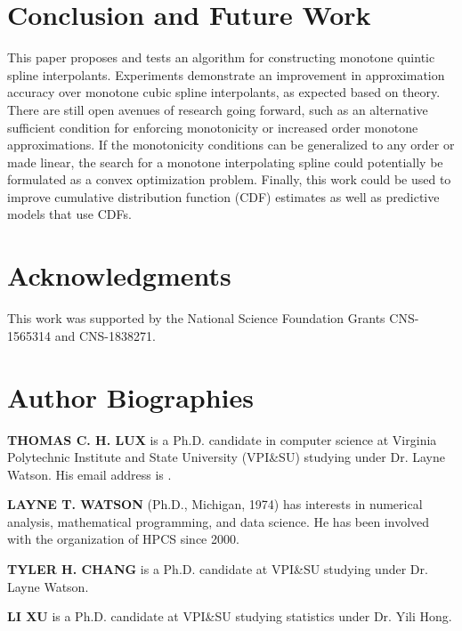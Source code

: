 \documentclass{scspaperproc}
\theoremstyle{scsthe}
\begin{document}
\section{Conclusion and Future Work}
\label{sec:conclusion}

This paper proposes and tests an algorithm for constructing monotone quintic spline interpolants. Experiments demonstrate an improvement in approximation accuracy over monotone cubic spline interpolants, as expected based on theory. There are still open avenues of research going forward, such as an alternative sufficient condition for enforcing monotonicity or increased order monotone approximations. If the monotonicity conditions can be generalized to any order or made linear, the search for a monotone interpolating spline could potentially be formulated as a convex optimization problem. Finally, this work could be used to improve cumulative distribution function (CDF) estimates as well as predictive models that use CDFs.


\section*{Acknowledgments}
This work was supported by the National Science Foundation Grants CNS-1565314 and CNS-1838271.





\section*{Author Biographies}

\textbf{\uppercase{THOMAS C. H. LUX}} is a Ph.D. candidate in computer
science at Virginia Polytechnic Institute and State University
(VPI\&SU) studying under Dr. Layne Watson. His email address is
.

\textbf{\uppercase{Layne T. Watson}} (Ph.D., Michigan, 1974) has
interests in numerical analysis, mathematical programming, and data
science.  He has been involved with the organization of HPCS since
2000. 

\textbf{\uppercase{Tyler H. Chang}} is a Ph.D. candidate at VPI\&SU
studying under Dr. Layne Watson. 

\textbf{\uppercase{Li Xu}} is a Ph.D. candidate at VPI\&SU studying
statistics under Dr. Yili Hong. 
\end{document}
